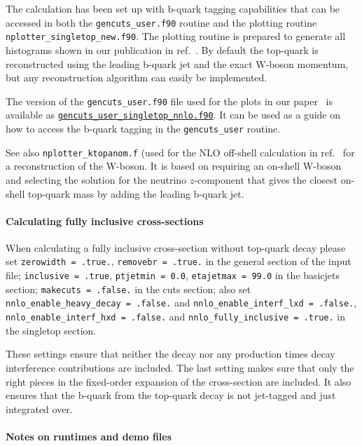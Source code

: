The calculation has been set up with b-quark tagging capabilities that
can be accessed in both the \texttt{gencuts\_user.f90} routine and the
plotting routine \texttt{nplotter\_singletop\_new.f90}. The plotting
routine is prepared to generate all histograms shown in our publication
in ref.~\cite{Campbell:2020fhf}. By default the top-quark is
reconstructed using the leading b-quark jet and the exact W-boson
momentum, but any reconstruction algorithm can easily be implemented.

The version of the \texttt{gencuts\_user.f90} file
used for the plots in our paper~\cite{Campbell:2020fhf} is available as
\href{\mcfmprocs/Files1610/gencuts_user_singletop_nnlo.f90}{{\tt gencuts\_user\_singletop\_nnlo.f90}}.
It can be used as a guide on how to access the b-quark tagging in the \texttt{gencuts\_user} routine.

See also \texttt{nplotter\_ktopanom.f} (used for the NLO off-shell
calculation in ref.~\cite{Neumann:2019kvk} for a reconstruction of the
W-boson. It is based on requiring an on-shell W-boson and selecting the
solution for the neutrino $z$-component that gives the closest on-shell
top-quark mass by adding the leading b-quark jet.

\paragraph{Calculating fully inclusive
cross-sections}\label{calculating-fully-inclusive-cross-sections}

When calculating a fully inclusive cross-section without top-quark decay
please set \texttt{zerowidth\ =\ .true.},
\texttt{removebr\ =\ .true.} in the general section of the input file;
\texttt{inclusive\ =\ .true}, \texttt{ptjetmin\ =\ 0.0},
\texttt{etajetmax\ =\ 99.0} in the basicjets section;
\texttt{makecuts\ =\ .false.} in the cuts section; also set
\texttt{nnlo\_enable\_heavy\_decay\ =\ .false.} and
\texttt{nnlo\_enable\_interf\_lxd\ =\ .false.},
\texttt{nnlo\_enable\_interf\_hxd\ =\ .false.} and
\texttt{nnlo\_fully\_inclusive\ =\ .true.} in the singletop section.

These settings ensure that neither the decay nor any production times
decay interference contributions are included. The last setting makes
sure that only the right pieces in the fixed-order expansion of the
cross-section are included. It also ensures that the b-quark from the
top-quark decay is not jet-tagged and just integrated over.

\paragraph{Notes on runtimes and demo files}\label{notes-on-runtimes-and-demo-files}

